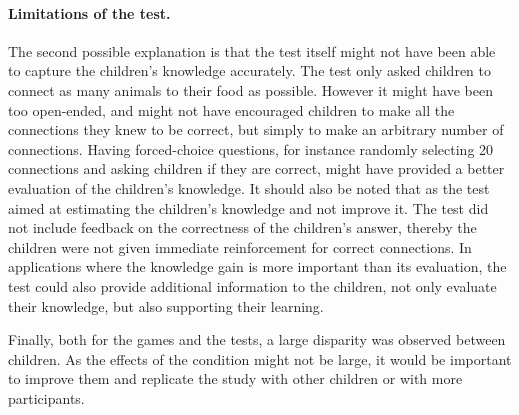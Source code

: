 \paragraph{Limitations of the test.} The second possible explanation is that the test itself might not have been able to capture the children's knowledge accurately. The test only asked children to connect as many animals to their food as possible. However it might have been too open-ended, and might not have encouraged children to make all the connections they knew to be correct, but simply to make an arbitrary number of connections. %
Having forced-choice questions, for instance randomly selecting 20 connections and asking children if they are correct, might have provided a better evaluation of the children's knowledge. It should also be noted that as the test aimed at estimating the children's knowledge and not improve it. The test did not include feedback on the correctness of the children's answer, thereby the children were not given immediate reinforcement for correct connections. In applications where the knowledge gain is more important than its evaluation, the test could also provide additional information to the children, not only evaluate their knowledge, but also supporting their learning.

Finally, both for the games and the tests, a large disparity was observed between children. As the effects of the condition might not be large, it would be important to improve them and replicate the study with other children or with more participants.



